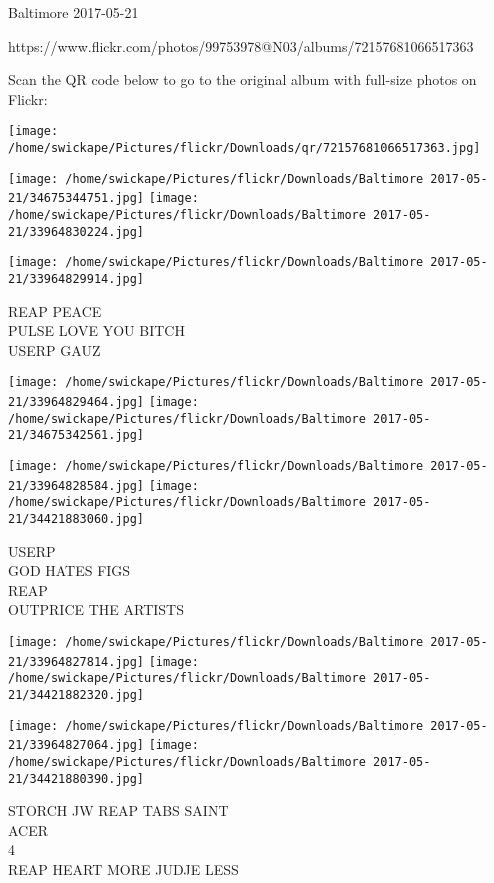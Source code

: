 \documentclass[10pt,letterpaper]{article}
\begin{document}
Baltimore 2017-05-21

https://www.flickr.com/photos/99753978@N03/albums/72157681066517363

Scan the QR code below to go to the original album with full-size photos on Flickr:

\texttt{[image: /home/swickape/Pictures/flickr/Downloads/qr/72157681066517363.jpg]}
\pagebreak

\texttt{[image: /home/swickape/Pictures/flickr/Downloads/Baltimore 2017-05-21/34675344751.jpg]}
\texttt{[image: /home/swickape/Pictures/flickr/Downloads/Baltimore 2017-05-21/33964830224.jpg]}

\vspace{0.25in}
\texttt{[image: /home/swickape/Pictures/flickr/Downloads/Baltimore 2017-05-21/33964829914.jpg]}

REAP PEACE\\
PULSE LOVE YOU BITCH\\
USERP GAUZ\\
\pagebreak

\texttt{[image: /home/swickape/Pictures/flickr/Downloads/Baltimore 2017-05-21/33964829464.jpg]}
\texttt{[image: /home/swickape/Pictures/flickr/Downloads/Baltimore 2017-05-21/34675342561.jpg]}

\texttt{[image: /home/swickape/Pictures/flickr/Downloads/Baltimore 2017-05-21/33964828584.jpg]}
\texttt{[image: /home/swickape/Pictures/flickr/Downloads/Baltimore 2017-05-21/34421883060.jpg]}

USERP\\
GOD HATES FIGS\\
REAP\\
OUTPRICE THE ARTISTS\\
\pagebreak

\texttt{[image: /home/swickape/Pictures/flickr/Downloads/Baltimore 2017-05-21/33964827814.jpg]}
\texttt{[image: /home/swickape/Pictures/flickr/Downloads/Baltimore 2017-05-21/34421882320.jpg]}

\texttt{[image: /home/swickape/Pictures/flickr/Downloads/Baltimore 2017-05-21/33964827064.jpg]}
\texttt{[image: /home/swickape/Pictures/flickr/Downloads/Baltimore 2017-05-21/34421880390.jpg]}

STORCH JW REAP TABS SAINT\\
ACER\\
4\\
REAP HEART MORE JUDJE LESS\\
\pagebreak
\end{document}
